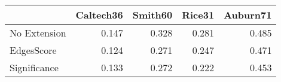 \begin{tabular}{lrrrr}
\toprule
{} & Caltech36 & Smith60 & Rice31 & Auburn71 \\
\midrule
No Extension &     0.147 &   0.328 &  0.281 &    0.485 \\
EdgesScore   &     0.124 &   0.271 &  0.247 &    0.471 \\
Significance &     0.133 &   0.272 &  0.222 &    0.453 \\
\bottomrule
\end{tabular}
